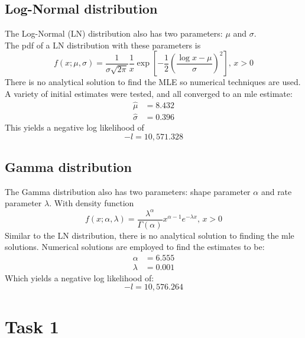 \documentclass{article}
\begin{document}
	
	\subsection{Log-Normal distribution}
	The Log-Normal (LN) distribution also has two parameters: $\mu$ and $ \sigma$.\\
	The pdf of a LN distribution with these parameters is
	$$f(x; \mu, \sigma) = \frac{1}{\sigma \sqrt{2\pi}}\frac{1}{x}\exp\left[-\frac{1}{2}\left(\frac{\log x-\mu}{\sigma}\right)^2\right], \, x>0$$
	There is no analytical solution to find the MLE so numerical techniques are used. A variety of initial estimates were tested, and all converged to an mle estimate:
	\begin{align*}
		\hat{\mu} &= 8.432\\
		\hat{\sigma} &= 0.396
	\end{align*}
	This yields a negative log likelihood of
	$$ -l = 10,571.328$$
	
	
	\subsection{Gamma distribution}
	The Gamma distribution also has two parameters: shape parameter $\alpha$ and rate parameter $\lambda$. With density function
	$$f(x; \alpha, \lambda) = \frac{\lambda^\alpha}{\Gamma(\alpha)}x^{\alpha-1}e^{-\lambda x}, \, x>0$$
	Similar to the LN distribution, there is no analytical solution to finding the mle solutions. Numerical solutions are employed to find the estimates to be:
	\begin{align*}
		\alpha &= 6.555\\
		\lambda &= 0.001
	\end{align*}
	Which yields a negative log likelihood of:
	$$-l = 10,576.264$$
	\appendix
	\section{Task 1}
\end{document}
